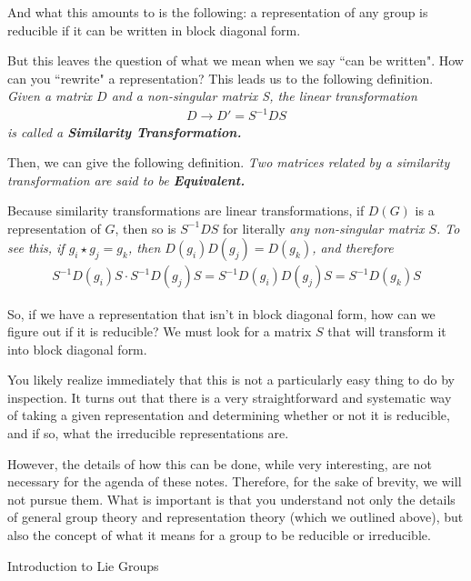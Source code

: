 \documentclass[12pt,epsf]{article}
\makeatletter
\def\subsection{\@startsection{subsection}{2}{\z@}{2.3ex plus .2ex}
 {2.3ex plus .2ex}{\bf}}
\def\nolabel{\nonumber }
\def\nolabel{\nonumber }
\makeatother
\begin{document}
And what this amounts to is the following: a representation of any
group is reducible if it can be written in block diagonal form.  

But this leaves the question of what we mean when we say ``can be
written".  How can you ``rewrite" a representation?  This leads us to
the following definition.  \it Given a matrix $D$ and a non-singular
matrix S, the linear transformation 
\begin{eqnarray}
D \rightarrow D' = S^{-1}DS \nolabel 
\end{eqnarray}
is called a \bf Similarity Transformation\rm.  

Then, we can give the following definition.  \it Two matrices related
by a similarity transformation are said to be \bf Equivalent\rm.  

Because similarity transformations are linear transformations, if
$D(G)$ is a representation of $G$, then so is $S^{-1}DS$ for literally
\it any \rm non-singular matrix $S$.  To see this, if $g_i\star g_j =
g_k$, then $D(g_i)D(g_j) = D(g_k)$, and therefore
\begin{eqnarray}
S^{-1}D(g_i)S\cdot S^{-1}D(g_j)S = S^{-1}D(g_i)D(g_j)S =
S^{-1}D(g_k)S\nolabel 
\end{eqnarray}

So, if we have a representation that isn't in block diagonal form, how
can we figure out if it is reducible?  We must look for a matrix $S$
that will transform it into block diagonal form.  

You likely realize immediately that this is not a particularly easy
thing to do by inspection.  It turns out that there is a very
straightforward and systematic way of taking a given representation and
determining whether or not it is reducible, and if so, what the
irreducible representations are.  

However, the details of how this can be done, while very interesting,
are not necessary for the agenda of these notes.  Therefore, for the
sake of brevity, we will not pursue them.  What is important is that
you understand not only the details of general group theory and
representation theory (which we outlined above), but also the concept
of what it means for a group to be reducible or irreducible.  

\subsection{Introduction to Lie Groups}
\label{sec:lieintro}
\end{document}
